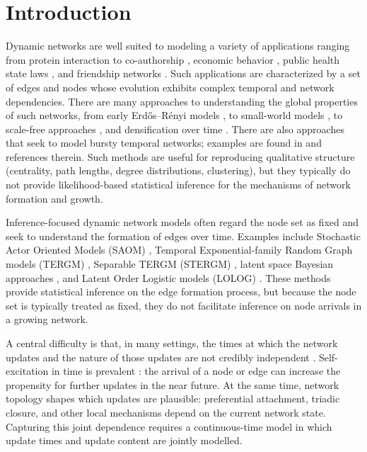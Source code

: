 \documentclass[12pt]{article}
\begin{document}
\section{Introduction}

Dynamic networks are well suited to modeling a variety of applications ranging from protein interaction \citep{jeong2001} to co-authorship \citep{newman2001}, economic behavior \citep{jackson2002evolution}, public health state laws \citep{clark2024}, and friendship networks \citep{lakon2014}. Such applications are characterized by a set of edges and nodes whose evolution exhibits complex temporal and network dependencies. There are many approaches to understanding the global properties of such networks, from early Erd\H{o}s--R\'enyi models \citep{erdos59}, to small-world models \citep{watts1998}, to scale-free approaches \citep{BA_model,BA_fitness_2001}, and densification over time \citep{Leskovec2005}. There are also approaches that seek to model bursty temporal networks; examples are found in \citet{sheng_bursty,holme_2012,holme_2015} and references therein. Such methods are useful for reproducing qualitative structure (centrality, path lengths, degree distributions, clustering), but they typically do not provide likelihood-based statistical inference for the mechanisms of network formation and growth.

Inference-focused dynamic network models often regard the node set as fixed and seek to understand the formation of edges over time. Examples include Stochastic Actor Oriented Models (SAOM) \citep{snijdersSAOM}, Temporal Exponential-family Random Graph models (TERGM) \citep{hanneke2010discrete}, Separable TERGM (STERGM) \citep{krivitsky_STERGM}, latent space Bayesian approaches \citep{Hoff2015}, and Latent Order Logistic models (LOLOG) \citep{Fellows2018}. These methods provide statistical inference on the edge formation process, but because the node set is typically treated as fixed, they do not facilitate inference on node arrivals in a growing network.

A central difficulty is that, in many settings, the times at which the network updates and the nature of those updates are not credibly independent \citep{snijders_2001}. Self-excitation in time is prevalent \cite{HuangLatentHawkes2022}: the arrival of a node or edge can increase the propensity for further updates in the near future. At the same time, network topology shapes which updates are plausible: preferential attachment, triadic closure, and other local mechanisms depend on the current network state. Capturing this joint dependence requires a continuous-time model in which update times and update content are jointly modelled.
\end{document}
